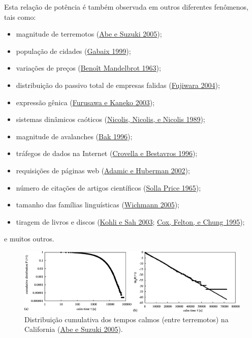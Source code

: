 \documentclass[
  ignorenonframetext,
  aspectratio=169]{beamer}
\providecommand{\tightlist}{%
  \setlength{\itemsep}{0pt}\setlength{\parskip}{0pt}}
\begin{document}
\begin{frame}
Esta relação de potência é também observada em outros diferentes
fenômenos, tais como:

\begin{itemize}
\tightlist
\item
  magnitude de terremotos (\protect\hyperlink{ref-suzuki2005}{Abe e
  Suzuki 2005});
\item
  população de cidades (\protect\hyperlink{ref-gabaix1999}{Gabaix
  1999});
\item
  variações de preços (\protect\hyperlink{ref-mandelbrot1963}{Benoît
  Mandelbrot 1963});
\item
  distribuição do passivo total de empresas falidas
  (\protect\hyperlink{ref-fujiwara2004}{Fujiwara 2004});
\item
  expressão gênica (\protect\hyperlink{ref-furusawa}{Furusawa e Kaneko
  2003});
\item
  sistemas dinâmicos caóticos
  (\protect\hyperlink{ref-nicolis1989}{Nicolis, Nicolis, e Nicolis
  1989});
\item
  magnitude de avalanches (\protect\hyperlink{ref-perbak}{Bak 1996});
\item
  tráfegos de dados na Internet
  (\protect\hyperlink{ref-crovella96}{Crovella e Bestavros 1996});
\item
  requisições de páginas web
  (\protect\hyperlink{ref-huberman2002}{Adamic e Huberman 2002});
\item
  número de citações de artigos científicos
  (\protect\hyperlink{ref-derek1965}{Solla Price 1965});
\item
  tamanho das famílias linguísticas
  (\protect\hyperlink{ref-wichmann2005}{Wichmann 2005});
\item
  tiragem de livros e discos (\protect\hyperlink{ref-kohli}{Kohli e Sah
  2003}; \protect\hyperlink{ref-cox}{Cox, Felton, e Chung 1995});
\end{itemize}

e muitos outros.
\end{frame}

\begin{frame}
\begin{figure}
\centering
\includegraphics[width=1\textwidth,height=\textheight]{abe-earthquakes.png}
\caption{Distribuição cumulativa dos tempos calmos (entre terremotos) na
California (\protect\hyperlink{ref-suzuki2005}{Abe e Suzuki 2005}).}
\end{figure}
\end{frame}
\end{document}
